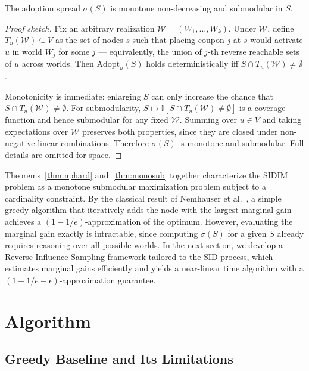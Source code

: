 \documentclass[sigconf]{acmart}
\begin{document}
\begin{theorem}
\label{thm:monosub}
The adoption spread $\sigma(S)$ is monotone non-decreasing and submodular in $S$.
\end{theorem}

\begin{proof}[Proof sketch]
Fix an arbitrary realization $\mathcal{W} = (W_1,\ldots,W_k)$. Under $\mathcal{W}$, define $T_u(\mathcal{W}) \subseteq V$ as the set of nodes $s$ such that placing coupon $j$ at $s$ would activate $u$ in world $W_j$ for some $j$ --- equivalently, the union of $j$-th reverse reachable sets of $u$ across worlds. Then $\mathrm{Adopt}_u(S)$ holds deterministically iff $S \cap T_u(\mathcal{W}) \neq \emptyset$.

Monotonicity is immediate: enlarging $S$ can only increase the chance that $S \cap T_u(\mathcal{W}) \neq \emptyset$. For submodularity, $S \mapsto \mathbb{I}[S \cap T_u(\mathcal{W}) \neq \emptyset]$ is a coverage function and hence submodular for any fixed $\mathcal{W}$. Summing over $u \in V$ and taking expectations over $\mathcal{W}$ preserves both properties, since they are closed under non-negative linear combinations. Therefore $\sigma(S)$ is monotone and submodular. Full details are omitted for space.
\end{proof}

Theorems~\ref{thm:nphard} and~\ref{thm:monosub} together characterize the SIDIM problem as a monotone submodular maximization problem subject to a cardinality constraint. By the classical result of Nemhauser et al.~\cite{nemhauser1978analysis}, a simple greedy algorithm that iteratively adds the node with the largest marginal gain achieves a $(1 - 1/e)$-approximation of the optimum. However, evaluating the marginal gain exactly is intractable, since computing $\sigma(S)$ for a given $S$ already requires reasoning over all possible worlds. In the next section, we develop a Reverse Influence Sampling framework tailored to the SID process, which estimates marginal gains efficiently and yields a near-linear time algorithm with a $(1 - 1/e - \epsilon)$-approximation guarantee.


\section{Algorithm}

\subsection{Greedy Baseline and Its Limitations}
\end{document}
